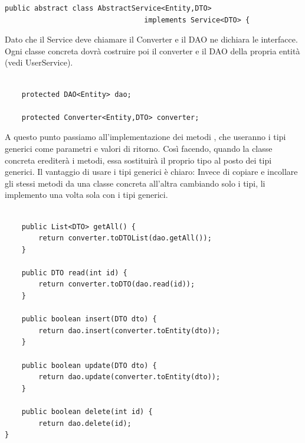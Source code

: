 \documentclass[a4paper,12 pt]{article}
\begin{document}
	\begin{lstlisting}
public abstract class AbstractService<Entity,DTO>
								 implements Service<DTO> {
\end{lstlisting}
	
	Dato che il Service deve chiamare il Converter e il DAO ne dichiara le interfacce. Ogni classe concreta dovrà costruire poi il converter e il DAO della propria entità (vedi UserService).
	\begin{lstlisting}

	protected DAO<Entity> dao;
	
	protected Converter<Entity,DTO> converter;
	\end{lstlisting}
	
	A questo punto passiamo all'implementazione dei metodi , che useranno i tipi generici come parametri e valori di ritorno. Così facendo, quando la classe concreta erediterà i metodi, essa sostituirà il proprio tipo al posto dei tipi generici. Il vantaggio di usare i tipi generici è chiaro: Invece di copiare e incollare gli stessi metodi da una classe concreta all'altra cambiando solo i tipi, li implemento una volta sola con i tipi generici.
	\begin{lstlisting}
		
	public List<DTO> getAll() {
		return converter.toDTOList(dao.getAll());
	}
	
	public DTO read(int id) {
		return converter.toDTO(dao.read(id));
	}

	public boolean insert(DTO dto) {
		return dao.insert(converter.toEntity(dto));
	}
	
	public boolean update(DTO dto) {
		return dao.update(converter.toEntity(dto));
	}
	
	public boolean delete(int id) {
		return dao.delete(id);
}
	
	\end{lstlisting}
	
	
	
\end{document}
